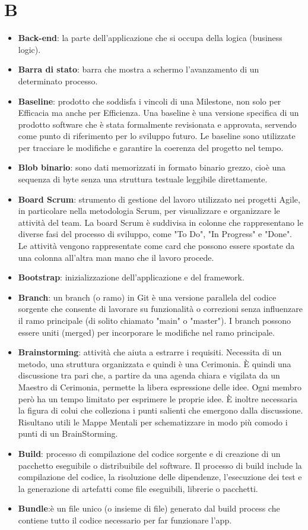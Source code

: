 \documentclass[a4paper,12pt]{article}
\begin{document}
\section{B}
\begin{itemize}
    \item \textbf{Back-end}: la parte dell'applicazione che si occupa della logica (business logic).
    \item \textbf{Barra di stato}: barra che mostra a schermo l'avanzamento di un determinato processo.
    \item \textbf{Baseline}: prodotto che soddisfa i vincoli di una Milestone, non solo per Efficacia ma anche per Efficienza. Una baseline è una versione specifica di un prodotto software che è stata formalmente revisionata e approvata, servendo come punto di riferimento per lo sviluppo futuro. Le baseline sono utilizzate per tracciare le modifiche e garantire la coerenza del progetto nel tempo.
    \item \textbf{Blob binario}: sono dati memorizzati in formato binario grezzo, cioè una sequenza di byte senza una struttura testuale leggibile direttamente.
    \item \textbf{Board Scrum}: strumento di gestione del lavoro utilizzato nei progetti Agile, in particolare nella metodologia Scrum, per visualizzare e organizzare le attività del team. La board Scrum è suddivisa in colonne che rappresentano le diverse fasi del processo di sviluppo, come "To Do", "In Progress" e "Done". Le attività vengono rappresentate come card che possono essere spostate da una colonna all'altra man mano che il lavoro procede.
    \item \textbf{Bootstrap}: inizializzazione dell'applicazione e del framework.
    \item \textbf{Branch}: un branch (o ramo) in Git è una versione parallela del codice sorgente che consente di lavorare su funzionalità o correzioni senza influenzare il ramo principale (di solito chiamato "main" o "master"). I branch possono essere uniti (merged) per incorporare le modifiche nel ramo principale.
    \item \textbf{Brainstorming}: attività che aiuta a estrarre i requisiti. Necessita di un metodo, una struttura organizzata e quindi è una Cerimonia. È quindi una discussione tra pari che, a partire da una agenda chiara e vigilata da un Maestro di Cerimonia, permette la libera espressione delle idee. Ogni membro però ha un tempo limitato per esprimere le proprie idee. È inoltre necessaria la figura di colui che colleziona i punti salienti che emergono dalla discussione. Risultano utili le Mappe Mentali per schematizzare in modo più comodo i punti di un BrainStorming.
    \item \textbf{Build}: processo di compilazione del codice sorgente e di creazione di un pacchetto eseguibile o distribuibile del software. Il processo di build include la compilazione del codice, la risoluzione delle dipendenze, l'esecuzione dei test e la generazione di artefatti come file eseguibili, librerie o pacchetti.
    \item \textbf{Bundle}:è un file unico (o insieme di file) generato dal build process che contiene tutto il codice necessario per far funzionare l’app. 
\end{itemize}
\end{document}
